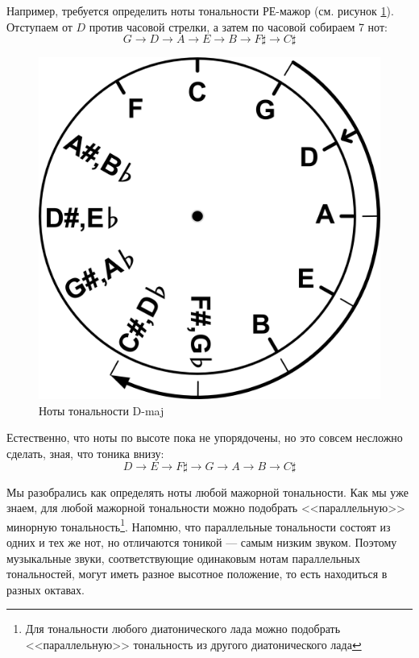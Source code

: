 Например, требуется определить ноты тональности РЕ-мажор (см. рисунок \ref{fig:harmony:kvinto-kvarto:d-maj}). Отступаем от $D$ против часовой стрелки, а затем по часовой собираем 7 нот:
\[
    G\rightarrow 
    D\rightarrow 
    A\rightarrow 
    E\rightarrow 
    B\rightarrow 
    {F\sharp}\rightarrow
    {C\sharp}
\]

\begin{figure}[!ht]
    \centering
    \includegraphics[scale=0.5]{fig/kvinto-kvarto/kvinto-kvarto-d-maj} 
    \caption{Ноты тональности D-maj}\label{fig:harmony:kvinto-kvarto:d-maj}
\end{figure}

Естественно, что ноты по высоте пока не упорядочены, но это совсем несложно сделать, зная, что тоника внизу:
\[
    D\rightarrow 
    E\rightarrow 
    {F\sharp}\rightarrow
    G\rightarrow 
    A\rightarrow 
    B\rightarrow 
    {C\sharp}
\]

Мы разобрались как определять ноты любой мажорной тональности. Как мы уже знаем, для любой мажорной тональности можно подобрать <<параллельную>> минорную тональность\footnote{Для тональности любого диатонического лада можно подобрать <<параллельную>> тональность из другого диатонического лада}. Напомню, что параллельные тональности состоят из одних и тех же нот, но отличаются тоникой --- самым низким звуком. Поэтому музыкальные звуки, соответствующие одинаковым нотам параллельных тональностей, могут иметь разное высотное положение, то есть находиться в разных октавах.

